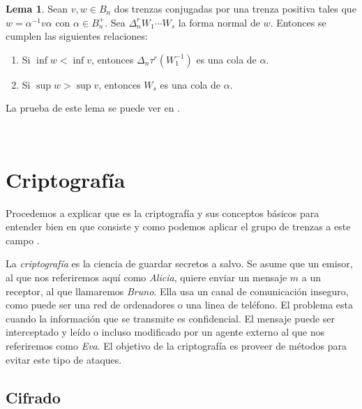 \documentclass[12pt]{book}
\theoremstyle{definition}
\newtheorem{lema}{Lema}[section]
\begin{document}
\begin{lema}
Sean $v,w\in B_n$ dos trenzas conjugadas por una trenza positiva tales que $w = \alpha^{-1}v\alpha$ con $\alpha\in B_n^{+}$. Sea $\Delta^r_n W_1\cdots W_s$ la forma normal de $w$. Entonces se cumplen las siguientes relaciones:
\begin{enumerate}
\item Si $\inf w < \inf v$, entonces $\Delta_n\tau^r(W_1^{-1})$ es una cola de $\alpha$.
\item Si $\sup w > \sup v$, entonces $W_s$ es una cola de $\alpha$.
\end{enumerate}
\label{lema:criptoanalisis}
\end{lema}
La prueba de este lema se puede ver en \cite{Alg}.






























\ 
\newline
\newline

\chapter{Criptografía}
Procedemos a explicar que es la criptografía y sus conceptos básicos para entender bien en que consiste y como podemos aplicar el grupo de trenzas a este campo \cite{in_cr}.

La \textit{criptografía} es la ciencia de guardar secretos a salvo. Se asume que un emisor, al que nos referiremos aquí como \textit{Alicia}, quiere enviar un mensaje $m$ a un receptor, al que llamaremos \textit{Bruno}. Ella usa un canal de comunicación inseguro, como puede ser una red de ordenadores o una linea de teléfono. El problema esta cuando la información que se transmite es confidencial. El mensaje puede ser interceptado y leído o incluso modificado por un agente externo al que nos referiremos como \textit{Eva}. El objetivo de la criptografía es proveer de métodos para evitar este tipo de ataques.

\section{Cifrado}
\end{document}
